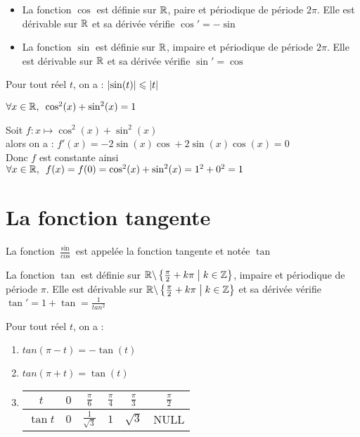 \begin{prop}
	\begin{itemize}
		\item La fonction \(\cos\) est définie sur \(\mathbb{R}\), paire et périodique de période \(2\pi\). Elle est dérivable sur \(\mathbb{R}\) et sa dérivée vérifie \(\cos' = -\sin\)
		\item La fonction \(\sin\) est définie sur \(\mathbb{R}\), impaire et périodique de période \(2\pi\). Elle est dérivable sur \(\mathbb{R}\) et sa dérivée vérifie \(\sin' = \cos\)
	\end{itemize}
\end{prop}

\begin{prop}
	Pour tout réel \(t\), on a : \(\left\lvert\sin(t)\right\rvert \leqslant \left\lvert t\right\rvert\)
\end{prop}
\begin{defprop}
    \(\quantifs{\forall x \in \R} \cos^2(x)+\sin^2(x) = 1\)
\end{defprop}
\begin{dem}
    Soit \(f:x\mapsto \cos^2(x)+\sin^2(x)\)\\
    alors on a : \(f'(x) = -2\sin(x)\cos + 2\sin(x)\cos(x) = 0\) \\
    Donc \(f\) est constante ainsi \(\quantifs{\forall x \in \R} f(x) = f(0) = \cos^2(x)+\sin^2(x) = 1^2+0^2 = 1\)
\end{dem}
\section{La fonction tangente}
\begin{defi}
	La fonction \(\frac{\sin}{\cos} \) est appelée la fonction tangente et notée \(\tan\)
\end{defi}

\begin{prop}
	La fonction \(\tan\) est définie sur \(\mathbb{R}\backslash\left\lbrace\frac{\pi}{2}+k\pi\;\middle|\; k\in \mathbb{Z}\right\rbrace\), impaire et périodique de période \(\pi\). Elle est dérivable sur \(\mathbb{R}\backslash\left\lbrace\frac{\pi}{2}+k\pi\;\middle|\; k\in \mathbb{Z}\right\rbrace\) et sa dérivée vérifie \(\tan' = 1+\tan = \frac{1}{tan^2}\)
\end{prop}

\begin{formu}
	Pour tout réel \(t\), on a :
	\begin{enumerate}
        \item \(tan(\pi-t) = -\tan(t)\)
        \item \(tan(\pi+t) = \tan(t) \)
        \item \begin{tabular}{|c|c|c|c|c|c|}

		\hline
		\(t\)       & \(0\) & \(\frac{\pi}{6}\)      & \(\frac{\pi}{4}\)      & \(\frac{\pi}{3}\)       & \(\frac{\pi}{2}\) \\
		\hline
		\(\tan t \) & \(0\) & \(\frac{1}{\sqrt{3}}\) & \(1\) & \(\sqrt{3}\)       & NULL             \\
		\hline
	\end{tabular}
    \end{enumerate}
\end{formu}

